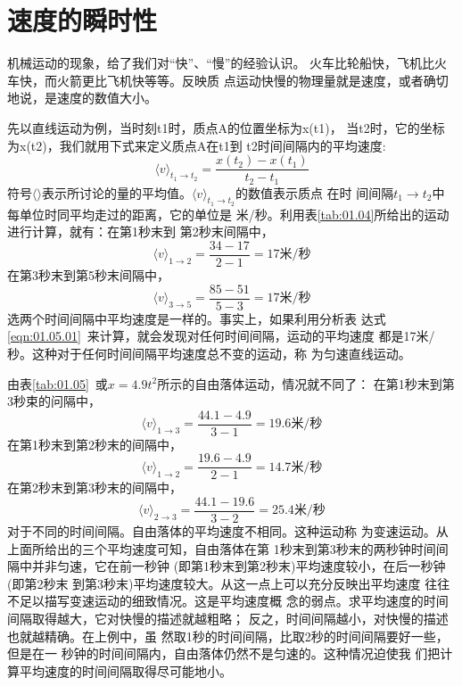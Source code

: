 \section{速度的瞬时性}\label{sec:01.06}

机械运动的现象，给了我们对“快”、“慢”的经验认识。
火车比轮船快，飞机比火车快，而火箭更比飞机快等等。反映质
点运动快慢的物理量就是速度，或者确切地说，是速度的数值大小。

先以直线运动为例，当时刻t1时，质点A的位置坐标为x(t1)，
当t2时，它的坐标为x(t2)，我们就用下式来定义质点A在t1到
t2时间间隔内的平均速度:
\begin{equation}
    \langle v\rangle_{t_{1} \rightarrow t_{2}}=\frac{x(t_{2})-x(t_{1})}{t_{2}-t_{1}} \label{eqn:01.06.01}
\end{equation}
符号$\langle \rangle$表示所讨论的量的平均值。$\langle v\rangle_{t_{1} \rightarrow t_{2}}$的数值表示质点
在时
\clearpage
\noindent 间间隔$t_{1} \rightarrow t_{2}$中每单位时同平均走过的距离，它的单位是
米/秒。利用表\ref{tab:01.04}所给出的运动进行计算，就有：在第1秒末到
第2秒末间隔中，
\begin{equation*}
    \langle v\rangle_{1 \rightarrow 2}=\frac{34-17}{2-1}=17\text{米/秒}
\end{equation*}
在第3秒末到第5秒末间隔中，
\begin{equation*}
    \langle v\rangle_{3 \rightarrow 5}=\frac{85-51}{5-3}=17\text{米/秒}
\end{equation*}
选两个时间间隔中平均速度是一样的。事实上，如果利用分析表
达式\eqref{eqn:01.05.01}~来计算，就会发现对任何时间间隔，运动的平均速度
都是17米/秒。这种对于任何时间间隔平均速度总不变的运动，称
为匀速直线运动。

由表\ref{tab:01.05}~或$x=4.9t^2$所示的自由落体运动，情况就不同了：
在第1秒末到第3秒束的问隔中，
\begin{equation*}
    \langle v\rangle_{1 \rightarrow 3}=\frac{44.1-4.9}{3-1}=19.6\text{米/秒}
\end{equation*}
在第1秒末到第2秒末的间隔中，
\begin{equation*}
    \langle v\rangle_{1 \rightarrow 2}=\frac{19.6-4.9}{2-1}=14.7\text{米/秒}
\end{equation*}
在第2秒末到第3秒末的间隔中，
\begin{equation*}
    \langle v\rangle_{2 \rightarrow 3}=\frac{44.1-19.6}{3-2}=25.4\text{米/秒}
\end{equation*}
对于不同的时间间隔。自由落体的平均速度不相同。这种运动称
为变速运动。从上面所给出的三个平均速度可知，自由落体在第
1秒末到第3秒末的两秒钟时间间隔中并非匀速，它在前一秒钟
(即第1秒末到第2秒末)平均速度较小，在后一秒钟(即第2秒末
到第3秒末)平均速度较大。从这一点上可以充分反映出平均速度
往往不足以描写变速运动的细致情况。这是平均速度概
念的弱点。求平均速度的时间间隔取得越大，它对快慢的描述就越粗略；
反之，时间间隔越小，对快慢的描述也就越精确。在上例中，虽
然取1秒的时间间隔，比取2秒的时间间隔要好一些，但是在一
秒钟的时间间隔内，自由落体仍然不是匀速的。这种情况迫使我
们把计算平均速度的时间间隔取得尽可能地小。

